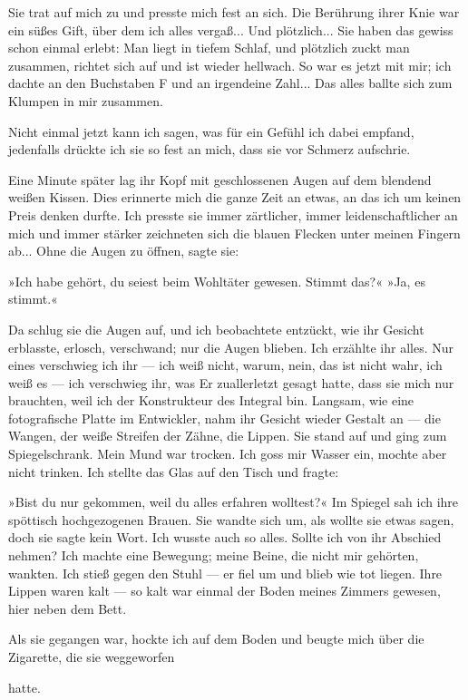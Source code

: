 Sie trat auf mich zu und presste mich fest an sich. Die Berührung
ihrer Knie war ein süßes Gift, über dem ich alles vergaß... Und
plötzlich... Sie haben das gewiss schon einmal erlebt: Man liegt in
tiefem Schlaf, und plötzlich zuckt man zusammen, richtet sich auf
und ist wieder hellwach. So war es jetzt mit mir; ich dachte an den
Buchstaben F und an irgendeine Zahl... Das alles ballte sich zum
Klumpen in mir zusammen.

Nicht einmal jetzt kann ich sagen, was für ein Gefühl ich dabei
empfand, jedenfalls drückte ich sie so fest an mich, dass sie vor
Schmerz aufschrie.

Eine Minute später lag ihr Kopf mit geschlossenen Augen auf dem
blendend weißen Kissen. Dies erinnerte mich die ganze Zeit an
etwas, an das ich um keinen Preis denken durfte. Ich presste sie
immer zärtlicher, immer leidenschaftlicher an mich und immer
stärker zeichneten sich die blauen Flecken unter meinen Fingern
ab... Ohne die Augen zu öffnen, sagte sie:

»Ich habe gehört, du seiest beim Wohltäter gewesen. Stimmt das?«
»Ja, es stimmt.«

Da schlug sie die Augen auf, und ich beobachtete entzückt, wie ihr
Gesicht erblasste, erlosch, verschwand; nur die Augen blieben. Ich
erzählte ihr alles. Nur eines verschwieg ich ihr — ich weiß nicht,
warum, nein, das ist nicht wahr, ich weiß es — ich verschwieg ihr,
was Er zuallerletzt gesagt hatte, dass sie mich nur brauchten, weil
ich der Konstrukteur des Integral bin. Langsam, wie eine
fotografische Platte im Entwickler, nahm ihr Gesicht wieder Gestalt
an — die Wangen, der weiße Streifen der Zähne, die Lippen. Sie
stand auf und ging zum Spiegelschrank. Mein Mund war trocken. Ich
goss mir Wasser ein, mochte aber nicht trinken. Ich stellte das
Glas auf den Tisch und fragte:

»Bist du nur gekommen, weil du alles erfahren wolltest?« Im Spiegel
sah ich ihre spöttisch hochgezogenen Brauen. Sie wandte sich um,
als wollte sie etwas sagen, doch sie sagte kein Wort. Ich wusste
auch so alles. Sollte ich von ihr Abschied nehmen? Ich machte eine
Bewegung; meine Beine, die nicht mir gehörten, wankten. Ich stieß
gegen den Stuhl — er fiel um und blieb wie tot liegen. Ihre Lippen
waren kalt — so kalt war einmal der Boden meines Zimmers gewesen,
hier neben dem Bett.

Als sie gegangen war, hockte ich auf dem Boden und beugte mich über
die Zigarette, die sie weggeworfen

hatte.

